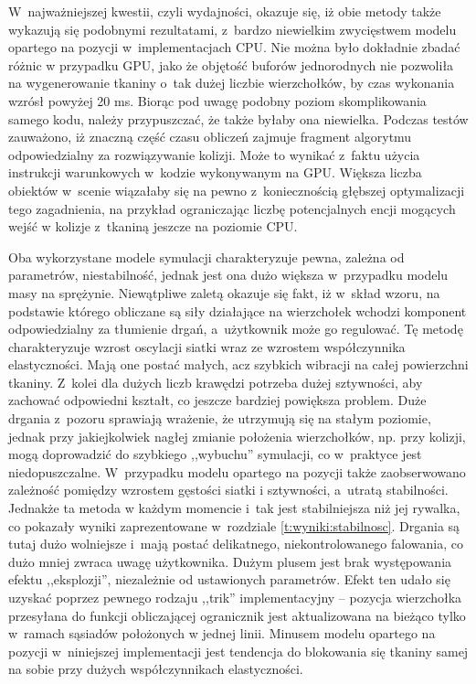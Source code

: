 	W~najważniejszej kwestii, czyli wydajności, okazuje się, iż obie metody także wykazują się podobnymi rezultatami, z~bardzo niewielkim zwycięstwem modelu opartego na pozycji w~implementacjach CPU. Nie można było dokładnie zbadać różnic w przypadku GPU, jako że objętość buforów jednorodnych nie pozwoliła na wygenerowanie tkaniny o~tak dużej liczbie wierzchołków, by czas wykonania wzrósł powyżej 20 ms. Biorąc pod uwagę podobny poziom skomplikowania samego kodu, należy przypuszczać, że także byłaby ona niewielka. Podczas testów zauważono, iż znaczną część czasu obliczeń zajmuje fragment algorytmu odpowiedzialny za rozwiązywanie kolizji. Może to wynikać z~faktu użycia instrukcji warunkowych w~kodzie wykonywanym na GPU. Większa liczba obiektów w~scenie wiązałaby się na pewno z~koniecznością głębszej optymalizacji tego zagadnienia, na przykład ograniczając liczbę potencjalnych encji mogących wejść w kolizje z~tkaniną jeszcze na poziomie CPU.
	
	Oba wykorzystane modele symulacji charakteryzuje pewna, zależna od parametrów, niestabilność, jednak jest ona dużo większa w~przypadku modelu masy na sprężynie. Niewątpliwe zaletą okazuje się fakt, iż w~skład wzoru, na podstawie którego obliczane są siły działające na wierzchołek wchodzi komponent odpowiedzialny za tłumienie drgań, a~użytkownik może go regulować. Tę metodę charakteryzuje wzrost oscylacji siatki wraz ze wzrostem współczynnika elastyczności. Mają one postać małych, acz szybkich wibracji na całej powierzchni tkaniny. Z~kolei dla dużych liczb krawędzi potrzeba dużej sztywności, aby zachować odpowiedni kształt, co jeszcze bardziej powiększa problem. Duże drgania z~pozoru sprawiają wrażenie, że utrzymują się na stałym poziomie, jednak przy jakiejkolwiek nagłej zmianie położenia wierzchołków, np. przy kolizji, mogą doprowadzić do szybkiego ,,wybuchu'' symulacji, co w~praktyce jest niedopuszczalne. W~przypadku modelu opartego na pozycji także zaobserwowano zależność pomiędzy wzrostem gęstości siatki i sztywności, a~utratą stabilności. Jednakże ta metoda w każdym momencie i~tak jest stabilniejsza niż jej rywalka, co pokazały wyniki zaprezentowane w~rozdziale \ref{t:wyniki:stabilnosc}. Drgania są tutaj dużo wolniejsze i~mają postać delikatnego, niekontrolowanego falowania, co dużo mniej zwraca uwagę użytkownika. Dużym plusem jest brak występowania efektu ,,eksplozji'', niezależnie od ustawionych parametrów. Efekt ten udało się uzyskać poprzez pewnego rodzaju ,,trik'' implementacyjny -- pozycja wierzchołka przesyłana do funkcji obliczającej ogranicznik jest aktualizowana na bieżąco tylko w~ramach sąsiadów położonych w jednej linii. Minusem modelu opartego na pozycji w~niniejszej implementacji jest tendencja do blokowania się tkaniny samej na sobie przy dużych współczynnikach elastyczności.
	
